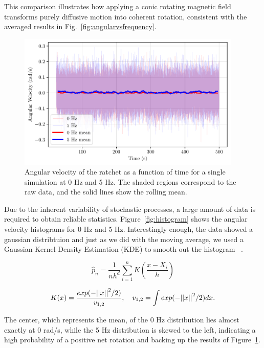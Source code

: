 This comparison illustrates how applying a conic rotating magnetic field transforms purely diffusive motion into coherent rotation, consistent with the averaged results in Fig.~\ref{fig:angularvsfrequency}.


\begin{figure}[h!]
\begin{center}
\includegraphics[width=0.95\textwidth]{figures/time_series.pdf}
\end{center}
\caption[Angular velocity as a function of time.]
{Angular velocity of the ratchet as a function of time for a single simulation at 0 Hz and 5 Hz. The shaded regions correspond to the raw data, and the solid lines show the rolling mean.}
\label{fig:velocityvstime}
\end{figure}

Due to the inherent variability of stochastic processes, a large amount of data is required to obtain reliable statistics. Figure~\ref{fig:histogram} shows the angular velocity histograms for 0 Hz and 5 Hz. Interestingly enough, the data showed a gaussian distribtuion and just as we did with the moving average, we used a Gaussian Kernel Density Estimation (KDE) to smooth out the histogram ~\cite{chen2017tutorial}. 

\begin{equation}
  \hat{p}_n = \frac{1}{nh^d} \displaystyle\sum_{i=1}^{n}K \left(\frac{x - X_i}{h}\right)
  \label{eq:kde}
\end{equation}

\begin{equation}
  K(x) = \frac{exp(-\abs{\abs{x}}^2/2)}{v_{1,2}}, \quad v_{1,2} = \displaystyle\int exp(-\abs{\abs{x}}^2/2)dx.
  \label{eq:gaussiankernel}
\end{equation}

The center, which represents the mean, of the 0 Hz distribution lies almost exactly at 0 rad/s, while the 5 Hz distribution is skewed to the left, indicating a high probability of a positive net rotation and backing up the results of Figure~\ref{fig:velocityvstime}.


